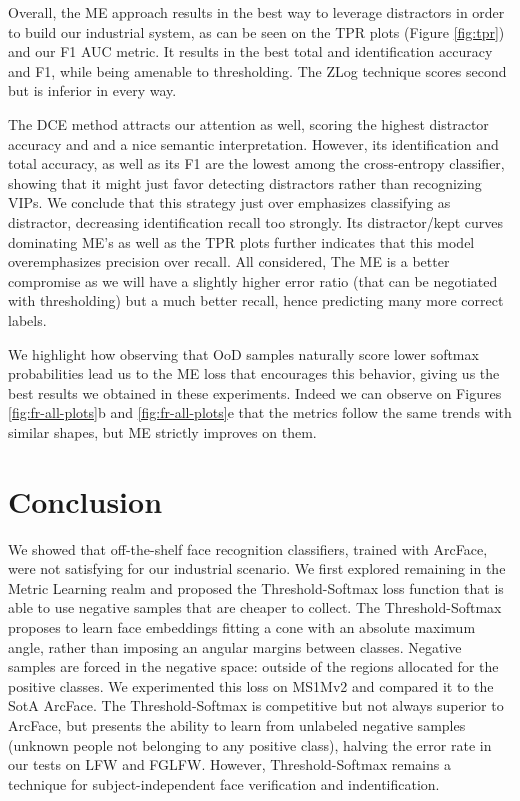 Overall, the ME approach results in the best way to leverage distractors in order to build our industrial system, as can be seen on the \ac{TPR} plots (Figure \ref{fig:tpr}) and our F1 AUC metric. It results in the best total and identification accuracy and F1, while being amenable to thresholding. The ZLog technique scores second but is inferior in every way.

The DCE method attracts our attention as well, scoring the highest distractor accuracy and and a nice semantic interpretation. However, its identification and total accuracy, as well as its F1 are the lowest among the cross-entropy classifier, showing that it might just favor detecting distractors rather than recognizing VIPs. We conclude that this strategy just over emphasizes classifying as distractor, decreasing identification recall too strongly. Its distractor/kept curves dominating ME's as well as the TPR plots further indicates that this model overemphasizes precision over recall. All considered, The ME is a better compromise as we will have a slightly higher error ratio (that can be negotiated with thresholding) but a much better recall, hence predicting many more correct labels.

We highlight how observing that \ac{OoD} samples naturally score lower softmax probabilities lead us to the ME loss that encourages this behavior, giving us the best results we obtained in these experiments. Indeed we can observe on Figures \ref{fig:fr-all-plots}b and \ref{fig:fr-all-plots}e that the metrics follow the same trends with similar shapes, but ME strictly improves on them.

\section{Conclusion}

We showed that off-the-shelf face recognition classifiers, trained with ArcFace, were not satisfying for our industrial scenario. We first explored remaining in the Metric Learning realm and proposed the Threshold-Softmax loss function that is able to use negative samples that are cheaper to collect. The Threshold-Softmax proposes to learn face embeddings fitting a cone with an absolute maximum angle, rather than imposing an angular margins between classes. Negative samples are forced in the negative space: outside of the regions allocated for the positive classes. We experimented this loss on MS1Mv2 and compared it to the \ac{SotA} ArcFace. The Threshold-Softmax is competitive but not always superior to ArcFace, but presents the ability to learn from unlabeled negative samples (unknown people not belonging to any positive class), halving the error rate in our tests on LFW and FGLFW. However, Threshold-Softmax remains a technique for subject-independent face verification and indentification.

